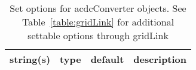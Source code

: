 \begin{table}[ht]
\centering
\begin{tabular}{p{5cm} c c p{7cm}}
\hline
string(s) & type & default & description \\
\hline
\hline
\end{tabular}
\caption{Set options for acdcConverter objects. See Table~\ref{table:gridLink} for additional settable options through gridLink}
\label{table:acdcConverter}
\end{table}

